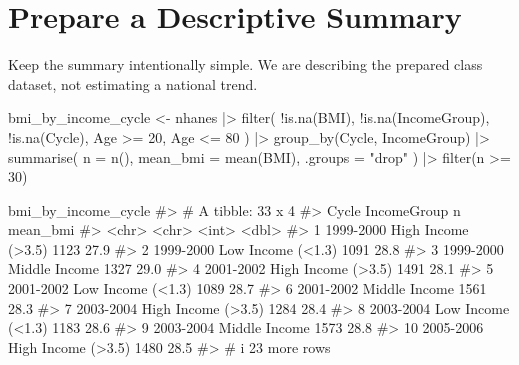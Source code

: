 \documentclass[
  letterpaper,
  DIV=11,
  numbers=noendperiod,
  oneside]{scrreprt}
\newenvironment{Shaded}{\begin{snugshade}}{\end{snugshade}}
\newcommand{\AttributeTok}[1]{\textcolor[rgb]{0.40,0.45,0.13}{#1}}
\newcommand{\CommentTok}[1]{\textcolor[rgb]{0.37,0.37,0.37}{#1}}
\newcommand{\DecValTok}[1]{\textcolor[rgb]{0.68,0.00,0.00}{#1}}
\newcommand{\FunctionTok}[1]{\textcolor[rgb]{0.28,0.35,0.67}{#1}}
\newcommand{\NormalTok}[1]{\textcolor[rgb]{0.00,0.23,0.31}{#1}}
\newcommand{\OtherTok}[1]{\textcolor[rgb]{0.00,0.23,0.31}{#1}}
\newcommand{\SpecialCharTok}[1]{\textcolor[rgb]{0.37,0.37,0.37}{#1}}
\newcommand{\StringTok}[1]{\textcolor[rgb]{0.13,0.47,0.30}{#1}}
\begin{document}
\section*{Prepare a Descriptive
Summary}\label{prepare-a-descriptive-summary}


Keep the summary intentionally simple. We are describing the prepared
class dataset, not estimating a national trend.

\begin{Shaded}
\begin{Highlighting}[numbers=left,,]
\NormalTok{bmi\_by\_income\_cycle }\OtherTok{\textless{}{-}}\NormalTok{ nhanes }\SpecialCharTok{|\textgreater{}}
  \FunctionTok{filter}\NormalTok{(}
    \SpecialCharTok{!}\FunctionTok{is.na}\NormalTok{(BMI),}
    \SpecialCharTok{!}\FunctionTok{is.na}\NormalTok{(IncomeGroup),}
    \SpecialCharTok{!}\FunctionTok{is.na}\NormalTok{(Cycle),}
\NormalTok{    Age }\SpecialCharTok{\textgreater{}=} \DecValTok{20}\NormalTok{,}
\NormalTok{    Age }\SpecialCharTok{\textless{}=} \DecValTok{80}
\NormalTok{  ) }\SpecialCharTok{|\textgreater{}}
  \FunctionTok{group\_by}\NormalTok{(Cycle, IncomeGroup) }\SpecialCharTok{|\textgreater{}}
  \FunctionTok{summarise}\NormalTok{(}
    \AttributeTok{n =} \FunctionTok{n}\NormalTok{(),}
    \AttributeTok{mean\_bmi =} \FunctionTok{mean}\NormalTok{(BMI),}
    \AttributeTok{.groups =} \StringTok{"drop"}
\NormalTok{  ) }\SpecialCharTok{|\textgreater{}}
  \FunctionTok{filter}\NormalTok{(n }\SpecialCharTok{\textgreater{}=} \DecValTok{30}\NormalTok{)}

\NormalTok{bmi\_by\_income\_cycle}
\CommentTok{\#\textgreater{} \# A tibble: 33 x 4}
\CommentTok{\#\textgreater{}    Cycle     IncomeGroup            n mean\_bmi}
\CommentTok{\#\textgreater{}    \textless{}chr\textgreater{}     \textless{}chr\textgreater{}              \textless{}int\textgreater{}    \textless{}dbl\textgreater{}}
\CommentTok{\#\textgreater{}  1 1999{-}2000 High Income (\textgreater{}3.5)  1123     27.9}
\CommentTok{\#\textgreater{}  2 1999{-}2000 Low Income (\textless{}1.3)   1091     28.8}
\CommentTok{\#\textgreater{}  3 1999{-}2000 Middle Income       1327     29.0}
\CommentTok{\#\textgreater{}  4 2001{-}2002 High Income (\textgreater{}3.5)  1491     28.1}
\CommentTok{\#\textgreater{}  5 2001{-}2002 Low Income (\textless{}1.3)   1089     28.7}
\CommentTok{\#\textgreater{}  6 2001{-}2002 Middle Income       1561     28.3}
\CommentTok{\#\textgreater{}  7 2003{-}2004 High Income (\textgreater{}3.5)  1284     28.4}
\CommentTok{\#\textgreater{}  8 2003{-}2004 Low Income (\textless{}1.3)   1183     28.6}
\CommentTok{\#\textgreater{}  9 2003{-}2004 Middle Income       1573     28.8}
\CommentTok{\#\textgreater{} 10 2005{-}2006 High Income (\textgreater{}3.5)  1480     28.5}
\CommentTok{\#\textgreater{} \# i 23 more rows}
\end{Highlighting}
\end{Shaded}
\end{document}
